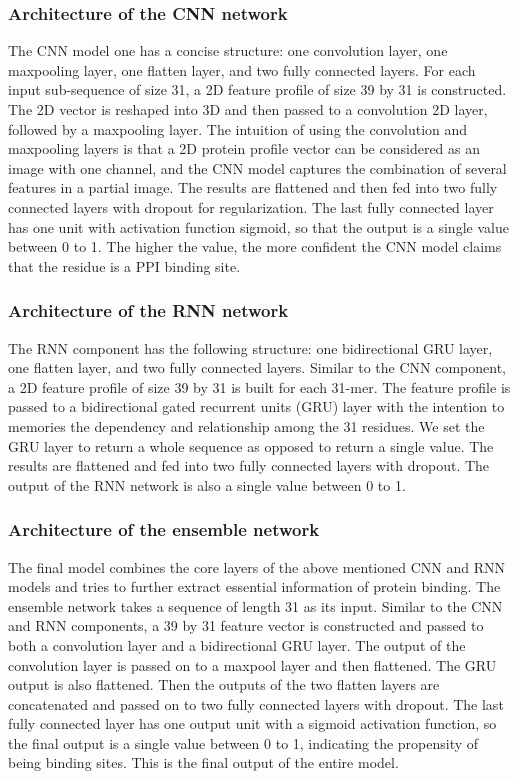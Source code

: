 \documentclass{bioinfo}
\begin{document}
\begin{methods}
\subsubsection{Architecture of the CNN network}
The CNN model one has a concise structure: one convolution layer, one maxpooling layer, one flatten layer, and two fully connected layers. For each input sub-sequence of size 31, a 2D feature profile of size 39 by 31 is constructed. The 2D vector is reshaped into 3D and then passed to a convolution 2D layer, followed by a maxpooling layer. The intuition of using the convolution and maxpooling layers is that a 2D protein profile vector can be considered as an image with one channel, and the CNN model captures the combination of several features in a partial image. The results are flattened and then fed into two fully connected layers with dropout for regularization. The last fully connected layer has one unit with activation function sigmoid, so that the output is a single value between 0 to 1. The higher the value, the more confident the CNN model claims that the residue is a PPI binding site.

\subsubsection{Architecture of the RNN network}
The RNN component has the following structure: one bidirectional GRU layer, one flatten layer, and two fully connected layers. Similar to the CNN component, a 2D feature profile of size 39 by 31 is built for each 31-mer. The feature profile is passed to a bidirectional gated recurrent units (GRU) layer with the intention to memories the dependency and relationship among the 31 residues. We set the GRU layer to return a whole sequence as opposed to return a single value. The results are flattened and fed into two fully connected layers with dropout. The output of the RNN network is also a single value between 0 to 1.

\subsubsection{Architecture of the ensemble network} \label{section_ensemble}
The final model combines the core layers of the above mentioned CNN and RNN models and tries to further extract essential information of protein binding. The ensemble network takes a sequence of length 31 as its input. Similar to the CNN and RNN components, a 39 by 31 feature vector is constructed and passed to both a convolution layer and a bidirectional GRU layer. The output of the convolution layer is passed on to a maxpool layer and then flattened. The GRU output is also flattened. Then the outputs of the two flatten layers are concatenated and passed on to two fully connected layers with dropout. The last fully connected layer has one output unit with a sigmoid activation function, so the final output is a single value between 0 to 1, indicating the propensity of being binding sites. This is the final output of the entire model. 


\end{methods}
\end{document}
